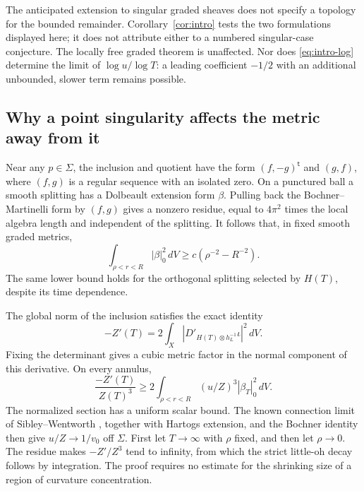 \documentclass[11pt]{amsart}
\theoremstyle{definition}
\theoremstyle{remark}
\begin{document}
The anticipated extension to singular graded sheaves does not specify a
topology for the bounded remainder.
Corollary~\ref{cor:intro} tests the two formulations displayed here;
it does not attribute either to a numbered singular-case conjecture.
The locally free graded theorem is unaffected. Nor does
\eqref{eq:intro-log} determine the limit of $\log u/\log T$: a leading
coefficient $-1/2$ with an additional unbounded, slower term remains
possible.

\subsection{Why a point singularity affects the metric away from it}
Near any $p\in\Sigma$, the inclusion and quotient have the form
$(f,-g)^{\mathsf t}$ and $(g,f)$, where $(f,g)$ is a regular sequence
with an isolated zero. On a punctured ball a smooth splitting has a
Dolbeault extension form $\beta$. Pulling back the Bochner--Martinelli
form by $(f,g)$ gives a nonzero residue, equal to $4\pi^2$ times the
local algebra length and independent of the splitting. It follows that, in fixed smooth graded metrics,
\begin{equation}\label{eq:intro-residue}
 \int_{\rho<r<R}|\beta|_0^2\,dV
       \ge c(\rho^{-2}-R^{-2}).
\end{equation}
The same lower bound holds for the orthogonal splitting selected by
$H(T)$, despite its time dependence.

The global norm of the inclusion satisfies the exact identity
\[
 -Z'(T)=2\int_X|D'_{H(T)\otimes h_L^{-1}}\iota|^2\,dV.
\]
Fixing the determinant gives a cubic metric factor in the normal
component of this derivative. On every annulus,
\[
 \frac{-Z'(T)}{Z(T)^3}
 \ge2\int_{\rho<r<R}(u/Z)^3|\beta_T|_0^2\,dV.
\]
The normalized section has a uniform scalar bound. The known connection
limit of Sibley--Wentworth \cite{sibleywentworth2015}, together with
Hartogs extension, and the Bochner identity then give $u/Z\to1/v_0$ off $\Sigma$.
First let $T\to\infty$ with $\rho$ fixed, and then let $\rho\to0$.
The residue makes $-Z'/Z^3$ tend to infinity, from which the strict
little-oh decay follows by integration. The proof requires no estimate
for the shrinking size of a region of curvature concentration.
\end{document}
